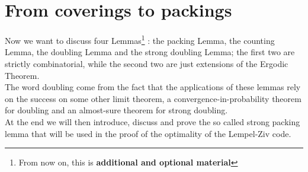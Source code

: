 \section{From coverings to packings}
Now we want to discuss four Lemmas\footnote{From now on, this is \textbf{additional and optional material}} : the packing Lemma, the counting
Lemma, the doubling Lemma and the strong doubling Lemma; the first two are strictly combinatorial, while the second two are just extensions of the Ergodic Theorem.
\\The word doubling come from the fact that the applications of these
lemmas rely on the success on some other limit theorem, a
convergence-in-probability theorem for doubling and an almost-sure theorem for strong doubling. 
\\At the end we will then introduce, discuss and prove the so called strong packing lemma that will be used in the proof of the optimality of the Lempel-Ziv code.

